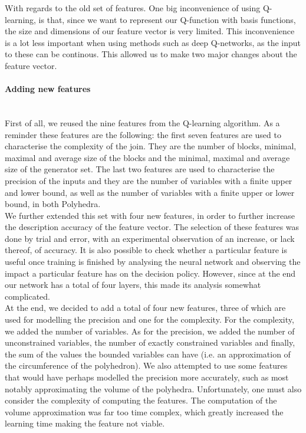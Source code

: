 With regards to the old set of features. One big inconvenience of using Q-learning, is that, since we want to represent our Q-function with basis functions, the size and dimensions of our feature vector is very limited. This inconvenience is a lot less important when using methods such as deep Q-networks, as the input to these can be continous. This allowed us to make two major changes about the feature vector. 
\paragraph{Adding new features}\mbox{}\\
First of all, we reused the nine features from the Q-learning algorithm. As a reminder these features are the following: the first seven features are used to characterise the complexity of the join. They are the number of blocks, minimal, maximal and average size of the blocks and the minimal, maximal and average size of the generator set. The last two features are used to characterise the precision of the inputs and they are the number of variables with a finite upper and lower bound, as well as the number of variables with a finite upper or lower bound, in both Polyhedra.\\
We further extended this set with four new features, in order to further increase the description accuracy of the feature vector. The selection of these features was done by trial and error, with an experimental observation of an increase, or lack thereof, of accuracy. It is also possible to check whether a particular feature is useful once training is finished by analysing the neural network and observing the impact a particular feature has on the decision policy. However, since at the end our network has a total of four layers, this made its analysis somewhat complicated.\\
At the end, we decided to add a total of four new features, three of which are used for modelling the precision and one for the complexity. For the complexity, we added the number of variables. As for the precision, we added the number of unconstrained variables, the number of exactly constrained variables and finally, the sum of the values the bounded variables can have (i.e. an approximation of the circumference of the polyhedron). We also attempted to use some features that would have perhaps modelled the precision more accurately, such as most notably approximating the volume of the polyhedra. Unfortunately, one must also consider the complexity of computing the features. The computation of the volume approximation was far too time complex, which greatly increased the learning time making the feature not viable.\\
